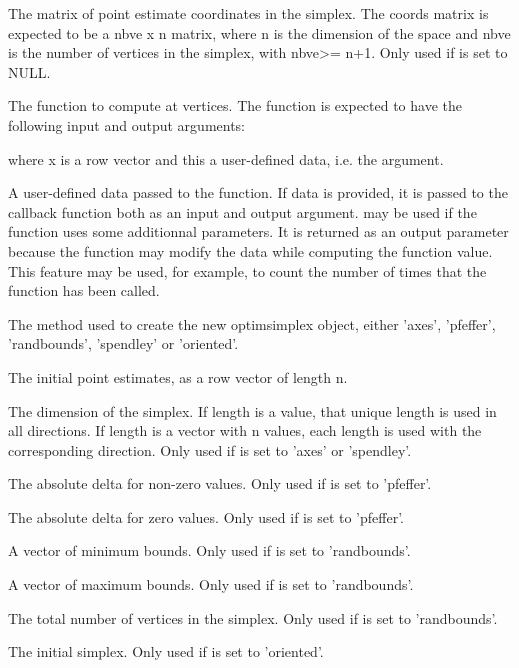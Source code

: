 %
\begin{Arguments}
\begin{ldescription}
\item[\code{coords}] The matrix of point estimate coordinates in the simplex. The
coords matrix is expected to be a nbve x n matrix, where n is the dimension
of the space and nbve is the number of vertices in the simplex, with nbve>=
n+1. Only used if  is set to NULL.
\item[\code{fun}] The function to compute at vertices. The function is expected to
have the following input and output arguments:

where x is a row vector and this a user-defined data, i.e. the 
argument.
\item[\code{data}] A user-defined data passed to the function. If data is provided,
it is passed to the callback function both as an input and output argument.
 may be used if the function uses some additionnal parameters. It
is returned as an output parameter because the function may modify the data
while computing the function value. This feature may be used, for example,
to count the number of times that the function has been called.
\item[\code{method}] The method used to create the new optimsimplex object, either
'axes', 'pfeffer', 'randbounds', 'spendley' or 'oriented'.
\item[\code{x0}] The initial point estimates, as a row vector of length n.
\item[\code{len}] The dimension of the simplex. If length is a value, that unique
length is used in all directions. If length is a vector with n values, each
length is used with the corresponding direction. Only used if 
is set to 'axes' or 'spendley'.
\item[\code{deltausual}] The absolute delta for non-zero values. Only used if
 is set to 'pfeffer'.
\item[\code{deltazero}] The absolute delta for zero values. Only used if
 is set to 'pfeffer'.
\item[\code{boundsmin}] A vector of minimum bounds. Only used if  is
set to 'randbounds'.
\item[\code{boundsmax}] A vector of maximum bounds. Only used if  is
set to 'randbounds'.
\item[\code{nbve}] The total number of vertices in the simplex. Only used if
 is set to 'randbounds'.
\item[\code{simplex0}] The initial simplex. Only used if  is set to
'oriented'.
\end{ldescription}
\end{Arguments}
